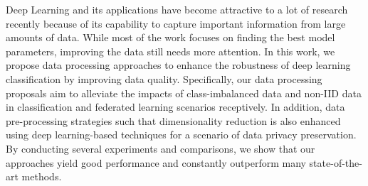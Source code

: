 \par  

Deep Learning and its applications have become attractive to a lot of research recently because of its capability to capture important information from large amounts of data. While most of the work focuses on finding the best model parameters, improving the data still needs more attention. In this work, we propose data processing approaches to enhance the robustness of deep learning classification by improving data quality. Specifically, our data processing proposals aim to alleviate the impacts of class-imbalanced data and non-IID data in classification and federated learning scenarios receptively. In addition, data pre-processing strategies such that dimensionality reduction is also enhanced using deep learning-based techniques for a scenario of data privacy preservation. By conducting several experiments and comparisons, we show that our approaches yield good performance and constantly outperform many state-of-the-art methods.  